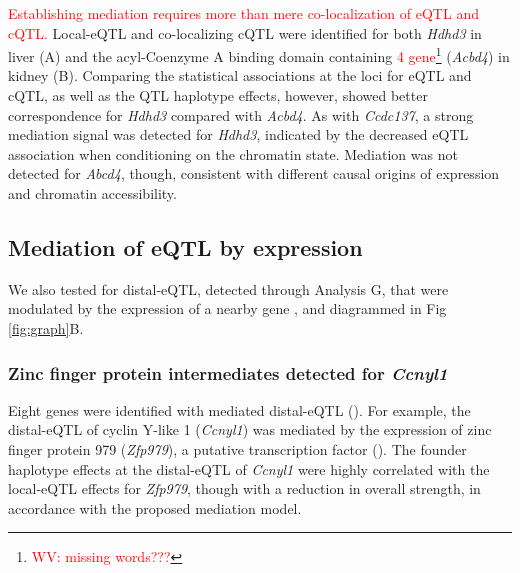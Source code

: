 \documentclass[10pt,letterpaper]{article}
\newcommand{\WV}[2]{\textcolor{red}{#1\footnote{\textcolor{red}{WV: #2}}}}
\newcommand{\WVinline}[1]{\textcolor{red}{#1}}
\begin{document}
\WVinline{Establishing mediation requires more than mere co-localization of eQTL and cQTL.}
Local-eQTL and co-localizing cQTL were identified for both \textit{Hdhd3} in liver (A) and the acyl-Coenzyme A binding domain containing \WV{4 gene}{missing words???} (\textit{Acbd4}) in kidney (B). Comparing the statistical associations at the loci for eQTL and cQTL, as well as the QTL haplotype effects, however, showed better correspondence for \textit{Hdhd3} compared with \textit{Acbd4}. As with \textit{Ccdc137}, a strong mediation signal was detected for \textit{Hdhd3}, indicated by the decreased eQTL association when conditioning on the chromatin state. Mediation was not detected for \textit{Abcd4}, though, consistent with different causal origins of expression and chromatin accessibility.

\subsection*{Mediation of eQTL by expression} 

We also tested for distal-eQTL, detected through Analysis G, that were modulated by the expression of a nearby gene \cite{Keller2018}, and diagrammed in Fig \ref{fig:graph}B. 

\subsubsection*{Zinc finger protein intermediates detected for \textit{Ccnyl1}}
Eight genes were identified with mediated distal-eQTL (). For example, the distal-eQTL of cyclin Y-like 1 (\textit{Ccnyl1}) was mediated by the expression of zinc finger protein 979 (\textit{Zfp979}), a putative transcription factor (). The founder haplotype effects at the distal-eQTL of \textit{Ccnyl1} were highly correlated with the local-eQTL effects for \textit{Zfp979}, though with a reduction in overall strength, in accordance with the proposed mediation model.
\end{document}
